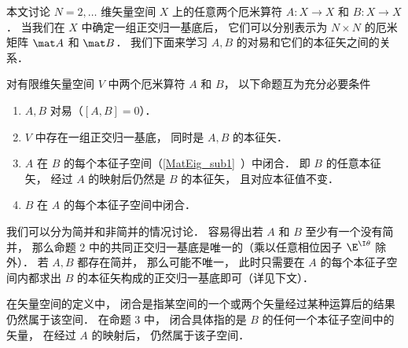 

本文讨论 $N = 2, \dots$ 维矢量空间 $X$ 上的任意两个厄米算符 $A: X \to X$ 和 $B: X \to X$． 当我们在 $X$ 中确定一组正交归一基底后， 它们可以分别表示为 $N \times N$ 的厄米矩阵 $\mat A$ 和 $\mat B$． 我们下面来学习 $A, B$ 的对易和它们的本征矢之间的关系．

\begin{theorem}{}\label{Commut_the1}
对有限维矢量空间 $V$ 中两个厄米算符 $A$ 和 $B$， 以下命题互为充分必要条件
\begin{enumerate}
\item $A,B$ 对易（$[A,B] = 0$）．
\item $V$ 中存在一组正交归一基底， 同时是 $A, B$ 的本征矢．
\item $A$ 在 $B$ 的每个本征子空间（\autoref{MatEig_sub1}~）中闭合． 即 $B$ 的任意本征矢， 经过 $A$ 的映射后仍然是 $B$ 的本征矢， 且对应本征值不变．
\item $B$ 在 $A$ 的每个本征子空间中闭合．
\end{enumerate}
\end{theorem}

我们可以分为简并和非简并的情况讨论． 容易得出若 $A$ 和 $B$ 至少有一个没有简并， 那么命题 2 中的共同正交归一基底是唯一的（乘以任意相位因子 $\E^{\I\theta}$ 除外）． 若 $A,B$ 都存在简并， 那么可能不唯一， 此时只需要在 $A$ 的每个本征子空间内都求出 $B$ 的本征矢构成的正交归一基底即可（详见下文）．

在矢量空间的定义中， 闭合是指某空间的一个或两个矢量经过某种运算后的结果仍然属于该空间． 在命题 3 中， 闭合具体指的是 $B$ 的任何一个本征子空间中的矢量， 在经过 $A$ 的映射后， 仍然属于该子空间．

